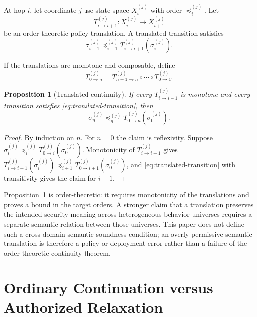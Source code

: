 \documentclass[10pt,twocolumn]{article}
\newcommand{\coord}{\sigma}
\newtheorem{proposition}{Proposition}
\begin{document}
At hop $i$, let coordinate $j$ use state space $X_i^{(j)}$ with order
$\preceq_i^{(j)}$.  Let
\begin{equation}
  T_{i\rightarrow i+1}^{(j)}:
  X_i^{(j)}\to X_{i+1}^{(j)}
\end{equation}
be an order-theoretic policy translation.  A translated transition satisfies
\begin{equation}
  \coord_{i+1}^{(j)}
  \preceq_{i+1}^{(j)}
  T_{i\rightarrow i+1}^{(j)}(\coord_i^{(j)}).
  \label{eq:translated-transition}
\end{equation}

If the translations are monotone and composable, define
\begin{equation}
  T_{0\rightarrow n}^{(j)}
  =T_{n-1\rightarrow n}^{(j)}\circ\cdots\circ T_{0\rightarrow1}^{(j)}.
\end{equation}

\begin{proposition}[Translated continuity]\label{prop:translated}
If every $T^{(j)}_{i\rightarrow i+1}$ is monotone and every transition
satisfies \eqref{eq:translated-transition}, then
\begin{equation}
  \coord_n^{(j)}\preceq_n^{(j)}T_{0\rightarrow n}^{(j)}(\coord_0^{(j)}).
\end{equation}
\end{proposition}

\begin{proof}
By induction on $n$. For $n=0$ the claim is reflexivity. Suppose
$\coord_i^{(j)}\preceq_i^{(j)}T_{0\rightarrow i}^{(j)}(\coord_0^{(j)})$.
Monotonicity of $T^{(j)}_{i\rightarrow i+1}$ gives
$T^{(j)}_{i\rightarrow i+1}(\coord_i^{(j)})\preceq_{i+1}^{(j)}
T_{0\rightarrow i+1}^{(j)}(\coord_0^{(j)})$, and
\eqref{eq:translated-transition} with transitivity gives the claim for
$i+1$.
\end{proof}

Proposition~\ref{prop:translated} is order-theoretic: it requires monotonicity
of the translations and proves a bound in the target orders. A stronger claim
that a translation preserves the intended security meaning across heterogeneous
behavior universes requires a separate semantic relation between those
universes. This paper does not define such a cross-domain semantic soundness
condition; an overly permissive semantic translation is therefore a policy or
deployment error rather than a failure of the order-theoretic continuity
theorem.

\section{Ordinary Continuation versus Authorized Relaxation}
\label{sec:relaxation}
\end{document}
